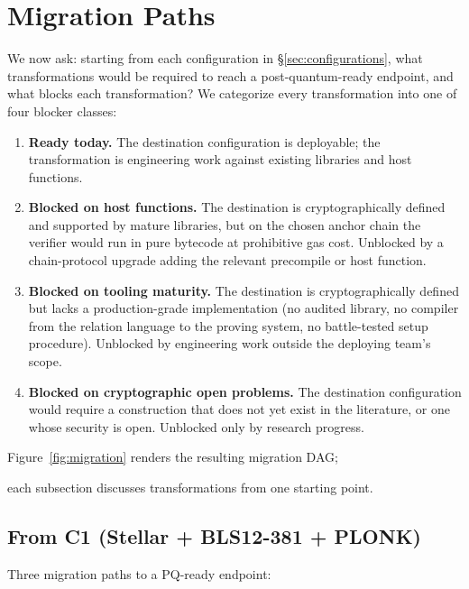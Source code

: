 \section{Migration Paths}
\label{sec:migration}

We now ask: starting from each configuration in
\S\ref{sec:configurations}, what transformations would be required to
reach a post-quantum-ready endpoint, and what blocks each
transformation? We categorize every transformation into one of four
blocker classes:

\begin{enumerate}
  \item[(a)] \textbf{Ready today.} The destination configuration is
    deployable; the transformation is engineering work against
    existing libraries and host functions.
  \item[(b)] \textbf{Blocked on host functions.} The destination is
    cryptographically defined and supported by mature libraries, but
    on the chosen anchor chain the verifier would run in pure
    bytecode at prohibitive gas cost. Unblocked by a chain-protocol
    upgrade adding the relevant precompile or host function.
  \item[(c)] \textbf{Blocked on tooling maturity.} The destination is
    cryptographically defined but lacks a production-grade
    implementation (no audited library, no compiler from the
    relation language to the proving system, no battle-tested setup
    procedure). Unblocked by engineering work outside the deploying
    team's scope.
  \item[(d)] \textbf{Blocked on cryptographic open problems.} The
    destination configuration would require a construction that does
    not yet exist in the literature, or one whose security is open.
    Unblocked only by research progress.
\end{enumerate}

Figure~\ref{fig:migration} renders the resulting migration DAG;

each subsection discusses transformations from one starting point.

\subsection{From C1 (Stellar + BLS12-381 + PLONK)}
\label{sec:mig-c1}

Three migration paths to a PQ-ready endpoint:

